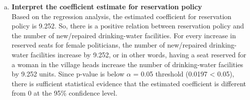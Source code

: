 \documentclass[12pt,letterpaper]{article}
\begin{document}
\begin{enumerate} [(a)]
\begin{verbatim}
			Residual standard error: 33.45 on 320 degrees of freedom
			Multiple R-squared:  0.01688,	Adjusted R-squared:  0.0138 
			F-statistic: 5.493 on 1 and 320 DF,  p-value: 0.0197
		\end{verbatim}
	
	\item \textbf{Interpret the coefficient estimate for reservation policy} \\
	Based on the regression analysis, the estimated coefficient for reservation policy is 9.252. So, there is a positive relation between reservation policy and the number of new/repaired drinking-water facilities. For every increase in reserved seats for female politicians, the number of new/repaired drinking-water facilities increase by 9.252, or in other words, having a seat reserved for a woman in the village heads increase the number of drinking-water facilities by 9.252 units.
	Since p-value is below $\alpha$ = 0.05 threshold (0.0197 < 0.05), there is sufficient statistical evidence that the estimated coefficient is different from 0 at the 95\% confidence level.
	\end{enumerate}
\end{document}
